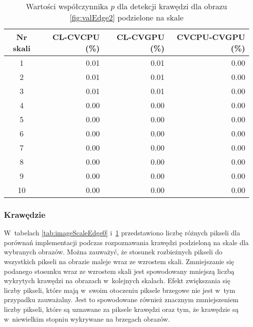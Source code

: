 \begin{center}
\begin{table}
\centering
\caption{Wartości współczynnika $ p $ dla detekcji krawędzi dla obrazu \ref{fig:valEdge2} podzielone na skale}
\label{tab:imageScaleEdge2}
\begin{tabular}{|c|r|r|r|}
 \hline
Nr skali & CL-CVCPU (\%) & CL-CVGPU (\%) & CVCPU-CVGPU (\%) \\ \hline
1        & 0.01     & 0.01     & 0.00        \\ \hline
2        & 0.01     & 0.01     & 0.00        \\ \hline
3        & 0.01     & 0.01     & 0.00        \\ \hline
4        & 0.00     & 0.00     & 0.00        \\ \hline
5        & 0.00     & 0.00     & 0.00        \\ \hline
6        & 0.00     & 0.00     & 0.00        \\ \hline
7        & 0.00     & 0.00     & 0.00        \\ \hline
8        & 0.00     & 0.00     & 0.00        \\ \hline
9        & 0.00     & 0.00     & 0.00        \\ \hline
10       & 0.00     & 0.00     & 0.00        \\ \hline
\end{tabular}
\end{table}
\end{center}

\subsubsection{Krawędzie}
\label{subsubsec:krawedzieTabele}

W~tabelach \ref{tab:imageScaleEdge0} i~\ref{tab:imageScaleEdge2} przedstawiono liczbę różnych pikseli dla porównań implementacji podczas rozpoznawania krawędzi podzieloną na skale dla wybranych obrazów. Można zauważyć, że stosunek rozbieżnych pikseli do wszystkich pikseli na obrazie maleje wraz ze wzrostem skali. Zmniejszanie się podanego stosunku wraz ze wzrostem skali jest spowodowany mniejszą liczbą wykrytych krawędzi na obrazach w~kolejnych skalach. Efekt zwiększania się liczby pikseli, które mają w~swoim otoczeniu piksele brzegowe nie jest w~tym przypadku zauważalny. Jest to spowodowane również znacznym zmniejszeniem liczby pikseli, które są uznawane za piksele krawędzi oraz tym, że krawędzie są w~niewielkim stopniu wykrywane na brzegach obrazów.


